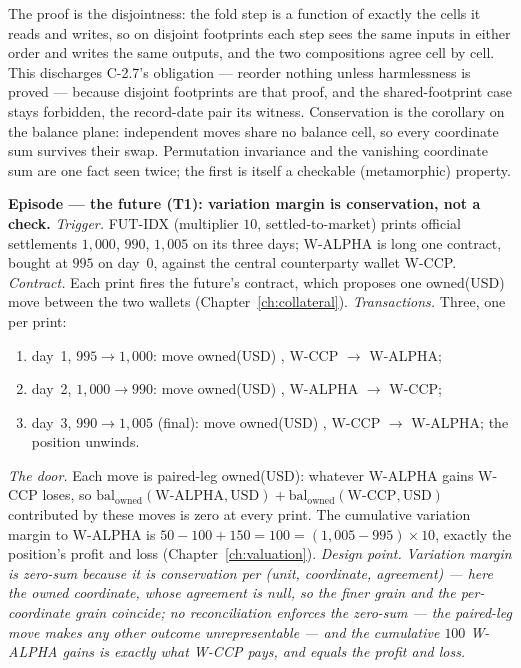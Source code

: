 The proof is the disjointness: the fold step is a function of exactly the cells it reads
and writes, so on disjoint footprints each step sees the same inputs in either order and
writes the same outputs, and the two compositions agree cell by cell. This discharges
C-2.7's obligation --- reorder nothing unless harmlessness is proved --- because disjoint
footprints are that proof, and the shared-footprint case stays forbidden, the record-date
pair its witness. Conservation is the corollary on the balance plane: independent moves
share no balance cell, so every coordinate sum survives their swap. Permutation invariance
and the vanishing coordinate sum are one fact seen twice; the first is itself a checkable
(metamorphic) property.

\medskip\noindent\textbf{Episode --- the future (T1): variation margin is
conservation, not a check.}
\emph{Trigger.} FUT-IDX (multiplier $10$, settled-to-market) prints official
settlements $1{,}000$, $990$, $1{,}005$ on its three days; W-ALPHA is long one
contract, bought at $995$ on day~0, against the central counterparty wallet
W-CCP. \emph{Contract.} Each print fires the future's contract, which proposes one
owned(USD) move between the two wallets (Chapter~\ref{ch:collateral}).
\emph{Transactions.} Three, one per print:
\begin{enumerate}[label=(\arabic*),nosep,leftmargin=2.2em]
\item day~1, $995\!\to\!1{,}000$: move owned(USD) , W-CCP $\to$ W-ALPHA;
\item day~2, $1{,}000\!\to\!990$: move owned(USD) , W-ALPHA $\to$ W-CCP;
\item day~3, $990\!\to\!1{,}005$ (final): move owned(USD) , W-CCP $\to$
  W-ALPHA; the position unwinds.
\end{enumerate}
\emph{The door.} Each move is paired-leg owned(USD): whatever W-ALPHA gains W-CCP
loses, so $\mathrm{bal}_{\text{owned}}(\text{W-ALPHA},\text{USD}) +
\mathrm{bal}_{\text{owned}}(\text{W-CCP},\text{USD})$ contributed by these moves is
zero at every print. The cumulative variation margin to W-ALPHA is
$50-100+150 = 100 = (1{,}005-995)\times 10$, exactly the position's profit and
loss (Chapter~\ref{ch:valuation}).
\emph{Design point.} \emph{Variation margin is zero-sum because it is
conservation per (unit, coordinate, agreement) --- here the owned coordinate, whose
agreement is null, so the finer grain and the per-coordinate grain coincide; no
reconciliation enforces the zero-sum ---
the paired-leg move makes any other outcome unrepresentable --- and the cumulative
$100$ W-ALPHA gains is exactly what W-CCP pays, and equals the profit and loss.}

